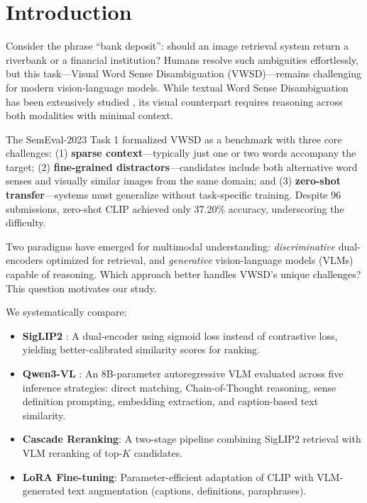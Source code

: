 \documentclass[11pt]{article}
\begin{document}
\section{Introduction}

Consider the phrase ``bank deposit'': should an image retrieval system return a riverbank or a financial institution? Humans resolve such ambiguities effortlessly, but this task---Visual Word Sense Disambiguation (VWSD)---remains challenging for modern vision-language models. While textual Word Sense Disambiguation has been extensively studied \cite{bevilacqua-etal-2021-recent}, its visual counterpart requires reasoning across both modalities with minimal context.

The SemEval-2023 Task 1 \cite{raganato2023semeval} formalized VWSD as a benchmark with three core challenges: (1) \textbf{sparse context}---typically just one or two words accompany the target; (2) \textbf{fine-grained distractors}---candidates include both alternative word senses and visually similar images from the same domain; and (3) \textbf{zero-shot transfer}---systems must generalize without task-specific training. Despite 96 submissions, zero-shot CLIP achieved only 37.20\% accuracy, underscoring the difficulty.

Two paradigms have emerged for multimodal understanding: \textit{discriminative} dual-encoders optimized for retrieval, and \textit{generative} vision-language models (VLMs) capable of reasoning. Which approach better handles VWSD's unique challenges? This question motivates our study.

We systematically compare:
\begin{itemize}
    \item \textbf{SigLIP2} \cite{zhai2023siglip}: A dual-encoder using sigmoid loss instead of contrastive loss, yielding better-calibrated similarity scores for ranking.
    \item \textbf{Qwen3-VL} \cite{yang2025qwen3}: An 8B-parameter autoregressive VLM evaluated across five inference strategies: direct matching, Chain-of-Thought reasoning, sense definition prompting, embedding extraction, and caption-based text similarity.
    \item \textbf{Cascade Reranking}: A two-stage pipeline combining SigLIP2 retrieval with VLM reranking of top-$K$ candidates.
    \item \textbf{LoRA Fine-tuning}: Parameter-efficient adaptation of CLIP with VLM-generated text augmentation (captions, definitions, paraphrases).
\end{itemize}
\end{document}
